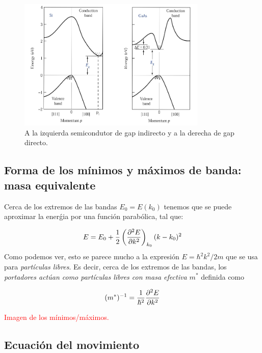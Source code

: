 \begin{figure}[h!] \centering
	\includegraphics[width=0.8\textwidth]{Cuerpo/Ch_01/01_02.png}
	\caption{A la izquierda semicondutor de gap indirecto y a la derecha de gap directo.}
\end{figure}


\subsection{Forma de los mínimos y máximos de banda: masa equivalente}

Cerca de los extremos de las bandas $E_0=E(k_0)$ tenemos que se puede aproximar la enerǵia por una función parabólica, tal que:

\begin{equation}
	E = E_0 + \frac{1}{2} \left( \frac{\partial ^2E}{\partial k^2} \right)_{k_0} (k-k_0)^2
\end{equation}
Como podemos ver, esto se parece mucho a la expresión $E=\hbar^2k^2/2m$ que se usa para \textit{partículas libres}. Es decir, cerca de los extremos de las bandas, los \textit{portadores actúan como partículas libres con masa efectiva $m^*$} definida como

\begin{equation}
	(m^*)^{-1} = \frac{1}{\hbar^2} \frac{\partial ^2E}{\partial k^2}
\end{equation}

\begin{Anotacion}
	\textcolor{red}{Imagen de los mínimos/máximos.}
\end{Anotacion}

\subsection{Ecuación del movimiento}

